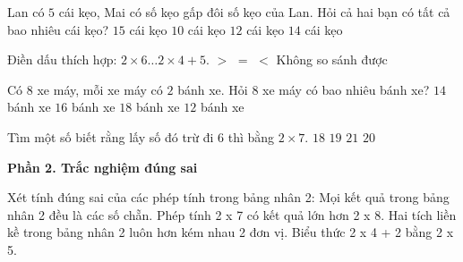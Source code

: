 \begin{ex} %
Lan có $5$ cái kẹo, Mai có số kẹo gấp đôi số kẹo của Lan. Hỏi cả hai bạn có tất cả bao nhiêu cái kẹo?
\choice
{\True $15$ cái kẹo}
{$10$ cái kẹo}
{$12$ cái kẹo}
{$14$ cái kẹo}
\end{ex}

\begin{ex} %
Điền dấu thích hợp: $2 \times 6 \dots 2 \times 4 + 5$.
\choice
{$>$}
{$=$}
{\True $<$}
{Không so sánh được}
\end{ex}

\begin{ex} %
Có $8$ xe máy, mỗi xe máy có $2$ bánh xe. Hỏi $8$ xe máy có bao nhiêu bánh xe?
\choice
{$14$ bánh xe}
{\True $16$ bánh xe}
{$18$ bánh xe}
{$12$ bánh xe}
\end{ex}

\begin{ex} %
Tìm một số biết rằng lấy số đó trừ đi $6$ thì bằng $2 \times 7$.
\choice
{$18$}
{$19$}
{$21$}
{\True $20$}
\end{ex}

\textbf{Phần 2. Trắc nghiệm đúng sai}

\begin{ex} %
Xét tính đúng sai của các phép tính trong bảng nhân 2:
\choiceTF
{\True Mọi kết quả trong bảng nhân 2 đều là các số chẵn.}
{Phép tính 2 x 7 có kết quả lớn hơn 2 x 8.}
{\True Hai tích liền kề trong bảng nhân 2 luôn hơn kém nhau 2 đơn vị.}
{\True Biểu thức 2 x 4 + 2 bằng 2 x 5.}
\end{ex}

